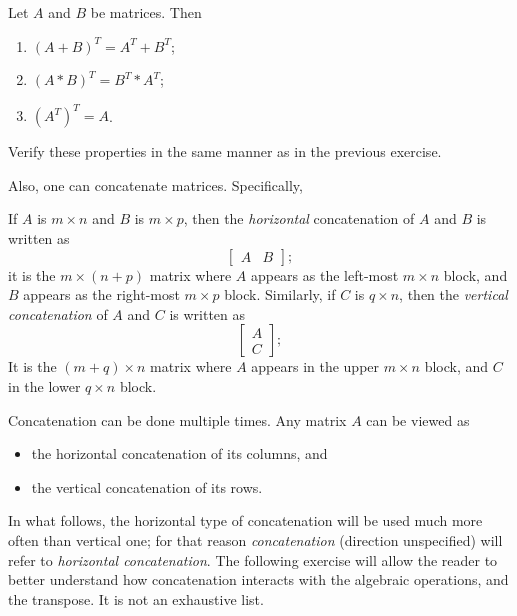 \documentclass{ximera}
\begin{document}
\begin{theorem} Let $A$ and $B$ be matrices. Then
\begin{enumerate}
\item $(A+B)^T = A^T + B^T$;
\item $(A*B)^T = B^T*A^T$;
\item $\left(A^T\right)^T = A$.
\end{enumerate}
\end{theorem}

\begin{exercise} Verify these properties in the same manner as in the previous exercise.
\end{exercise}

Also, one can concatenate matrices. Specifically,

\begin{definition} If $A$ is $m\times n$ and $B$ is $m\times p$, then the {\it horizontal} concatenation of $A$ and $B$ is written as
\[
\begin{bmatrix} 
A & B
\end{bmatrix};
\] 
it is the $m\times (n+p)$ matrix where $A$ appears as the left-most $m\times n$ block, and $B$ appears as the right-most $m\times p$ block. Similarly, if $C$ is $q\times n$, then the {\it vertical concatenation} of $A$ and $C$ is written as
\[
\begin{bmatrix} 
A\\ C
\end{bmatrix};
\]
It is the $(m+q)\times n$ matrix where $A$ appears in the upper $m\times n$ block, and $C$ in the lower $q\times n$ block.
\end{definition}
Concatenation can be done multiple times. Any matrix $A$ can be viewed as 
\begin{itemize}
\item the horizontal concatenation of its columns, and
\item the vertical concatenation of its rows.
\end{itemize}

In what follows, the horizontal type of concatenation will be used much more often than vertical one; for that reason {\it concatenation} (direction unspecified) will refer to {\it horizontal concatenation}. The following exercise will allow the reader to better understand how concatenation interacts with the algebraic operations, and the transpose. It is not an exhaustive list.
\end{document}
